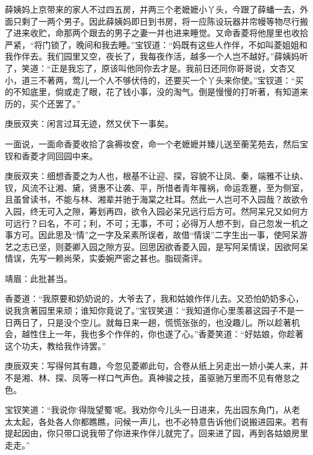 \begin{parag}
    薛姨妈上京带来的家人不过四五房，并两三个老嬷嬷小丫头，今跟了薛蟠一去，外面只剩了一两个男子。因此薛姨妈即日到书房，将一应陈设玩器并帘幔等物尽行搬了进来收贮，命那两个跟去的男子之妻一并也进来睡觉。又命香菱将他屋里也收拾严紧，“将门锁了，晚间和我去睡。”宝钗道：“妈既有这些人作伴，不如叫菱姐姐和我作伴去。我们园里又空，夜长了，我每夜作活，越多一个人岂不越好。”薛姨妈听了，笑道：“正是我忘了，原该叫他同你去才是。我前日还同你哥哥说，文杏又小，道三不著两，莺儿一个人不够伏侍的，还要买一个丫头来你使。”宝钗道：“买的不知底里，倘或走了眼，花了钱小事，没的淘气。倒是慢慢的打听著，有知道来历的，买个还罢了。”\begin{note}庚辰双夹：闲言过耳无迹，然又伏下一事矣。\end{note}一面说，一面命香菱收拾了衾褥妆奁，命一个老嬷嬷并臻儿送至蘅芜苑去，然后宝钗和香菱才同回园中来。\begin{note}庚辰双夹：细想香菱之为人也，根基不让迎、探，容貌不让凤、秦，端雅不让纨、钗，风流不让湘、黛，贤惠不让袭、平，所惜者青年罹祸，命运乖蹇，至为侧室，且虽曾读书，不能与林、湘辈并驰于海棠之社耳。然此一人岂可不入园哉？故欲令入园，终无可入之隙，筹划再四，欲令入园必呆兄远行后方可。然阿呆兄又如何方可远行？曰名，不可；利，不可；无事，不可；必得万人想不到，自己忽发一机之事方可。因此思及“情”之一字及呆素所误者，故借“情误”二字生出一事，使阿呆游艺之志已坚，则菱卿入园之隙方妥。回思因欲香菱入园，是写阿呆情误，因欲阿呆情误，先写一赖尚荣，实委婉严密之甚也。脂砚斋评。\end{note}\begin{note}靖眉：此批甚当。\end{note}
\end{parag}


\begin{parag}
    香菱道：“我原要和奶奶说的，大爷去了，我和姑娘作伴儿去。又恐怕奶奶多心，说我贪著园里来顽；谁知你竟说了。”宝钗笑道：“我知道你心里羡慕这园子不是一日两日了，只是没个空儿。就每日来一趟，慌慌张张的，也没趣儿。所以趁著机会，越性住上一年，我也多个作伴的，你也遂了心。”香菱笑道：“好姑娘，你趁著这个功夫，教给我作诗罢。”\begin{note}庚辰双夹：写得何其有趣，今忽见菱卿此句，合卷从纸上另走出一娇小美人来，并不是湘、林、探、凤等一样口气声色。真神骏之技，虽驱驰万里而不见有倦怠之色。\end{note}宝钗笑道：“我说你‘得陇望蜀’呢。我劝你今儿头一日进来，先出园东角门，从老太太起，各处各人你都瞧瞧，问候一声儿，也不必特意告诉他们说搬进园来。若有提起因由，你只带口说我带了你进来作伴儿就完了。回来进了园，再到各姑娘房里走走。”
\end{parag}


